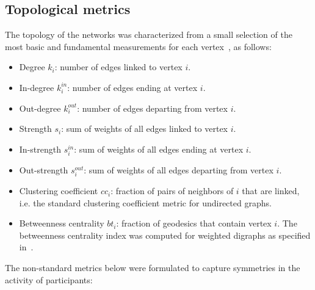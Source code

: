 
\subsection{Topological metrics}\label{measures}

The topology of the networks was characterized 
from a small selection of the most basic 
and fundamental measurements for each vertex~\cite{newmanBook}, as follows:

\begin{itemize}
\item Degree     $k_i$: number of edges linked to vertex $i$.
\item In-degree  $k_i^{in}$: number of edges ending at vertex $i$.
\item Out-degree $k_i^{out}$: number of edges departing from vertex $i$.
\item Strength $s_i$: sum of weights of all edges linked to vertex $i$.
\item In-strength $s_i^{in}$: sum of weights of all edges ending at vertex $i$.
\item Out-strength $s_i^{out}$: sum of weights of all edges departing from vertex $i$.
\item Clustering coefficient $cc_i$: fraction of pairs of neighbors of $i$ that are linked, i.e. the standard clustering coefficient metric for undirected graphs.
\item Betweenness centrality $bt_i$: fraction of geodesics that contain vertex $i$. The betweenness centrality index was computed for weighted digraphs as specified in~\cite{faster}.
\end{itemize}

The non-standard metrics below were formulated to capture symmetries in the activity of participants:

